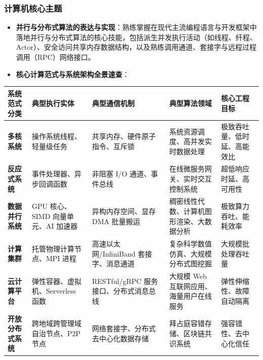 \subsubsection{计算机核心主题}
\begin{itemize}
    \item \textbf{并行与分布式算法的表达与实现}：熟练掌握在现代主流编程语言与开发框架中落地并行与分布式算法的核心技能，包括派生并发执行活动（如线程、纤程、Actor）、安全访问共享内存数据结构，以及熟练调用通道、套接字与远程过程调用（RPC）网络接口。
    \item \textbf{核心计算范式与系统架构全景速查}：
\end{itemize}

\begin{table}[t]
\centering
\begin{tabularx}{\textwidth}{p{} p{} Y Y p{0.18\textwidth}}
\toprule
\textbf{系统范式分类} & \textbf{典型执行实体} & \textbf{典型通信机制} & \textbf{典型算法领域} & \textbf{核心工程目标} \\
\midrule
\textbf{多核系统} & 操作系统线程、轻量级任务 & 共享内存、硬件原子指令、互斥锁 & 系统资源调度、高并发实时数据处理 & 极致吞吐量、低时延、高能效比 \\
\midrule
\textbf{反应式系统} & 事件处理器、异步回调函数 & 非阻塞 I/O 通道、事件总线 & 在线微服务网关、实时交互控制系统 & 超低响应时延、高可用性 \\
\midrule
\textbf{数据并行系统} & GPU 核心、SIMD 向量单元、AI 加速器 & 异构内存空间、显存 DMA 批量搬运 & 稠密线性代数、计算机图形渲染、大数据分析 & 极致算力吞吐、能耗效率 \\
\midrule
\textbf{计算集群} & 托管物理计算节点、MPI 进程 & 高速以太网/InfiniBand 套接字、消息通道 & 复杂科学数值仿真、大规模分布式图挖掘 & 大规模批处理吞吐量 \\
\midrule
\textbf{云计算平台} & 弹性容器、虚拟机、Serverless 函数 & RESTful/gRPC 服务接口、分布式消息总线 & 大规模 Web 互联网应用、海量用户在线服务 & 弹性伸缩性、故障自动隔离 \\
\midrule
\textbf{开放分布式系统} & 跨地域跨管理域自治节点、P2P 节点 & 网络套接字、分布式去中心化数据存储 & 拜占庭容错存储、区块链共识系统 & 强容错性、去中心化信任 \\
\bottomrule
\end{tabularx}
\end{table}

